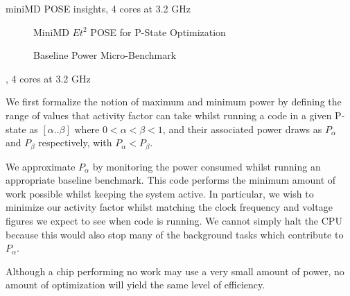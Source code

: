 \begin{table}
\centering

\caption{miniMD POSE insights, 4 cores at 3.2 GHz}
\end{table} 


\begin{figure}
\centering

\caption{MiniMD $Et^2$ POSE for P-State Optimization}
\label{fig:minimd-pstates}
\end{figure}


\begin{figure}[ht]                                                               
\centering                                                                      
\lstset{basicstyle=\ttfamily\footnotesize\bfseries, frame=tb} %
              
\caption{Baseline Power Micro-Benchmark}                            
\label{fig:microbench}                                                           
\end{figure}  



\begin{table}
\centering

\caption{, 4 cores at 3.2 GHz}
\end{table} 


We first formalize the notion of maximum and minimum power by defining the range of values that activity factor can take whilst running a code in a given P-state as $[\alpha  .. \beta]$ where $0 < \alpha < \beta < 1$, and their associated power draws as $P_{\alpha}$ and $P_{\beta}$ respectively, with $P_{\alpha} < P_{\beta}$. 


We approximate $P_{\alpha}$ by monitoring the power consumed whilst running an appropriate baseline benchmark. This code performs the minimum amount of work possible whilst keeping the system active. In particular, we wish to minimize our activity factor whilst matching the clock frequency and voltage figures we expect to see when code is running. We cannot simply halt the CPU because this would also stop many of the background tasks which contribute to $P_{\alpha}$.

Although a chip performing no work may use a very small amount of power, no amount of optimization will yield the same level of efficiency.


